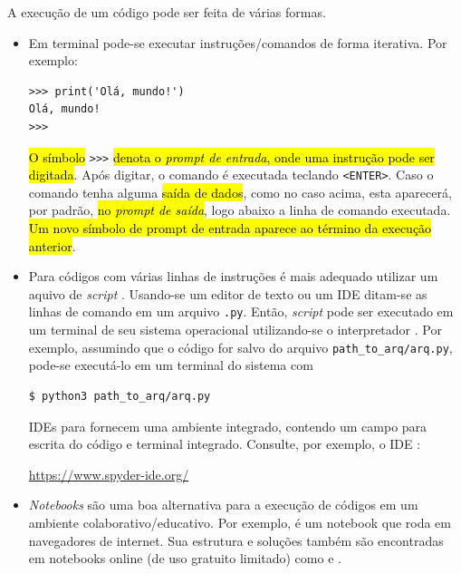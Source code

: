 A execução de um código {\python} pode ser feita de várias formas.

\begin{itemize}
\item {}

  Em terminal {\python} pode-se executar instruções/comandos de forma iterativa. Por exemplo:

\begin{lstlisting}[xrightmargin=2.5em]
>>> print('Olá, mundo!')
Olá, mundo!
>>> 
\end{lstlisting}      

  \hl{O símbolo }\lstinline+>>>+\hl{ denota o \emph{prompt de entrada}, onde uma instrução {\python} pode ser digitada}. Após digitar, o comando é executada teclando \lstinline+<ENTER>+. Caso o comando tenha alguma \hl{saída de dados}, como no caso acima, esta aparecerá, por padrão, \hl{no \emph{prompt de saída}}, logo abaixo a linha de comando executada. \hl{Um novo símbolo de prompt de entrada aparece ao término da execução anterior}.

\item {}

  Para códigos com várias linhas de instruções é mais adequado utilizar um aquivo de \textit{script} {\python}. Usando-se um editor de texto ou um IDE ditam-se as linhas de comando em um arquivo \lstinline+.py+. Então, \textit{script} pode ser executado em um terminal de seu sistema operacional utilizando-se o interpretador {\python}. Por exemplo, assumindo que o código for salvo do arquivo \lstinline+path_to_arq/arq.py+, pode-se executá-lo em um terminal do sistema com

\begin{lstlisting}[xrightmargin=2.5em]
$ python3 path_to_arq/arq.py 
\end{lstlisting}%
  

  IDEs para {\python} fornecem uma ambiente integrado, contendo um campo para escrita do código e terminal {\python} integrado. Consulte, por exemplo, o IDE {\spyder}:
  \begin{center}
    \url{https://www.spyder-ide.org/}
  \end{center}

\item {}

  \textit{Notebooks} {\python} são uma boa alternativa para a execução de códigos em um ambiente colaborativo/educativo. Por exemplo, {\jupyter} é um notebook que roda em navegadores de internet. Sua estrutura e soluções também são encontradas em notebooks online (de uso gratuito limitado) como {\colab} e {\kaggle}.  
\end{itemize}

